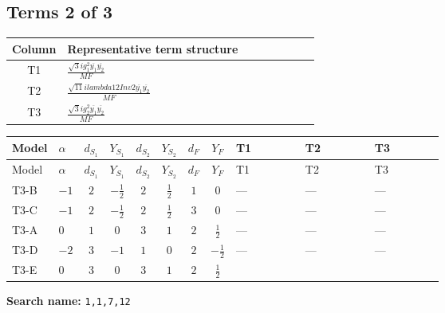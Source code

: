 \documentclass[8pt]{article}
\begin{document}
\begin{landscape}
\subsection*{Terms 2 of 3}
\begin{center}
\begin{tabular}{@{}c >{\raggedright\arraybackslash}p{0.82\linewidth}@{}}
\toprule
Column & Representative term structure \\
\midrule
T1 & \(\displaystyle \frac{\sqrt{3} i g_{1}^{2} \overline{y_{1}} \overline{y_{2}}}{MF}\) \\
\midrule
T2 & \(\displaystyle \frac{\sqrt{11} i lambda12Inv2 \overline{y_{1}} \overline{y_{2}}}{MF}\) \\
\midrule
T3 & \(\displaystyle \frac{\sqrt{3} i g_{2}^{2} \overline{y_{1}} \overline{y_{2}}}{MF}\) \\
\midrule
\bottomrule
\end{tabular}
\end{center}
\smallskip
\tiny
\begin{longtable}{@{}llcccccc >{\raggedright\arraybackslash}p{0.21\linewidth} >{\raggedright\arraybackslash}p{0.21\linewidth} >{\raggedright\arraybackslash}p{0.21\linewidth}@{}}
\toprule
Model & $\alpha$ & $d_{S_1}$ & $Y_{S_1}$ & $d_{S_2}$ & $Y_{S_2}$ & $d_F$ & $Y_F$ & T1 & T2 & T3 \\
\midrule
\endfirsthead
\toprule
Model & $\alpha$ & $d_{S_1}$ & $Y_{S_1}$ & $d_{S_2}$ & $Y_{S_2}$ & $d_F$ & $Y_F$ & T1 & T2 & T3 \\
\midrule
\endhead
T3-B & $-1$ & $2$ & $-\frac{1}{2}$ & $2$ & $\frac{1}{2}$ & $1$ & $0$ & --- & --- & --- \\
\midrule
T3-C & $-1$ & $2$ & $-\frac{1}{2}$ & $2$ & $\frac{1}{2}$ & $3$ & $0$ & --- & --- & --- \\
\midrule
T3-A & $0$ & $1$ & $0$ & $3$ & $1$ & $2$ & $\frac{1}{2}$ & --- & --- & --- \\
\midrule
T3-D & $-2$ & $3$ & $-1$ & $1$ & $0$ & $2$ & $-\frac{1}{2}$ & --- & --- & --- \\
\midrule
T3-E & $0$ & $3$ & $0$ & $3$ & $1$ & $2$ & $\frac{1}{2}$ & \scriptsize\adjustbox{max width=\linewidth}{$\begin{gathered} \frac{\sqrt{3} i g_{1}^{2} \overline{y_{1}} \overline{y_{2}}}{8 MF}\end{gathered}$} & \scriptsize\adjustbox{max width=\linewidth}{$\begin{gathered} \frac{3 \sqrt{11} i lambda12Inv2 \overline{y_{1}} \overline{y_{2}}}{22 MF}\end{gathered}$} & \scriptsize\adjustbox{max width=\linewidth}{$\begin{gathered} \frac{49 \sqrt{3} i g_{2}^{2} \overline{y_{1}} \overline{y_{2}}}{24 MF}\end{gathered}$} \\
\midrule
\bottomrule
\end{longtable}
\clearpage
\noindent\textbf{Search name: }\texttt{1,1,7,12}\par\smallskip

\end{landscape}
\end{document}
